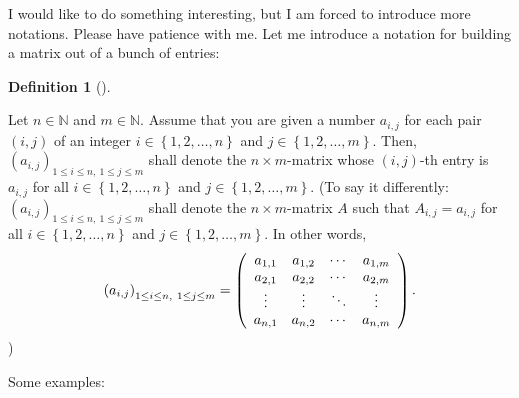 \documentclass[numbers=enddot,12pt,final,onecolumn,notitlepage]{scrartcl}%
\theoremstyle{definition}
\newtheorem{defi}[theo]{Definition}
\newenvironment{definition}[1][]
{\begin{defi}[#1]\begin{leftbar}}
{\end{leftbar}\end{defi}}
\begin{document}
I would like to do something interesting, but I am forced to introduce more
notations. Please have patience with me. Let me introduce a notation for
building a matrix out of a bunch of entries:

\begin{definition}
Let $n\in\mathbb{N}$ and $m\in\mathbb{N}$. Assume that you are given a number
$a_{i,j}$ for each pair $\left(  i,j\right)  $ of an integer $i\in\left\{
1,2,\ldots,n\right\}  $ and $j\in\left\{  1,2,\ldots,m\right\}  $. Then,
$\left(  a_{i,j}\right)  _{1\leq i\leq n,\ 1\leq j\leq m}$ shall denote the
$n\times m$-matrix whose $\left(  i,j\right)  $-th entry is $a_{i,j}$ for all
$i\in\left\{  1,2,\ldots,n\right\}  $ and $j\in\left\{  1,2,\ldots,m\right\}
$. (To say it differently: $\left(  a_{i,j}\right)  _{1\leq i\leq n,\ 1\leq
j\leq m}$ shall denote the $n\times m$-matrix $A$ such that $A_{i,j}=a_{i,j}$
for all $i\in\left\{  1,2,\ldots,n\right\}  $ and $j\in\left\{  1,2,\ldots
,m\right\}  $. In other words,%
\[
\left(  a_{i,j}\right)  _{1\leq i\leq n,\ 1\leq j\leq m}=\left(
\begin{array}
[c]{cccc}%
a_{1,1} & a_{1,2} & \cdots & a_{1,m}\\
a_{2,1} & a_{2,2} & \cdots & a_{2,m}\\
\vdots & \vdots & \ddots & \vdots\\
a_{n,1} & a_{n,2} & \cdots & a_{n,m}%
\end{array}
\right)  .
\]
)
\end{definition}

Some examples:
\end{document}
